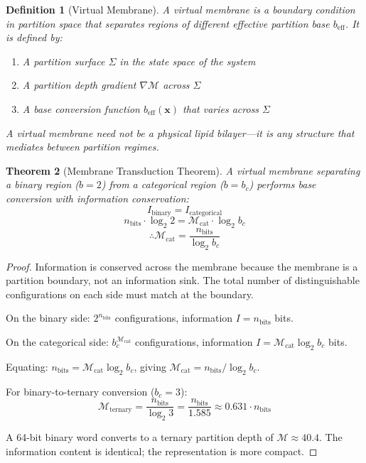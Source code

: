\documentclass[twocolumn,10pt]{article}
\newtheorem{theorem}{Theorem}[section]
\newtheorem{definition}[theorem]{Definition}
\theoremstyle{remark}
\newcommand{\Depth}{\mathcal{M}}
\begin{document}
\begin{definition}[Virtual Membrane]
\label{def:virtual_membrane}
A \emph{virtual membrane} is a boundary condition in partition space that separates regions of different effective partition base $b_{\text{eff}}$. It is defined by:
\begin{enumerate}
    \item A partition surface $\Sigma$ in the state space of the system
    \item A partition depth gradient $\nabla\Depth$ across $\Sigma$
    \item A base conversion function $b_{\text{eff}}(\mathbf{x})$ that varies across $\Sigma$
\end{enumerate}
A virtual membrane need not be a physical lipid bilayer---it is any structure that mediates between partition regimes.
\end{definition}

\begin{theorem}[Membrane Transduction Theorem]
\label{thm:transduction}
A virtual membrane separating a binary region ($b = 2$) from a categorical region ($b = b_c$) performs base conversion with information conservation:
\begin{equation}
    I_{\text{binary}} = I_{\text{categorical}}
\end{equation}
\begin{equation}
    n_{\text{bits}} \cdot \log_2 2 = \Depth_{\text{cat}} \cdot \log_2 b_c
\end{equation}
\begin{equation}
    \therefore \Depth_{\text{cat}} = \frac{n_{\text{bits}}}{\log_2 b_c}
\end{equation}
\end{theorem}

\begin{proof}
Information is conserved across the membrane because the membrane is a partition boundary, not an information sink. The total number of distinguishable configurations on each side must match at the boundary.

On the binary side: $2^{n_{\text{bits}}}$ configurations, information $I = n_{\text{bits}}$ bits.

On the categorical side: $b_c^{\Depth_{\text{cat}}}$ configurations, information $I = \Depth_{\text{cat}} \log_2 b_c$ bits.

Equating: $n_{\text{bits}} = \Depth_{\text{cat}} \log_2 b_c$, giving $\Depth_{\text{cat}} = n_{\text{bits}} / \log_2 b_c$.

For binary-to-ternary conversion ($b_c = 3$):
\begin{equation}
    \Depth_{\text{ternary}} = \frac{n_{\text{bits}}}{\log_2 3} = \frac{n_{\text{bits}}}{1.585} \approx 0.631 \cdot n_{\text{bits}}
\end{equation}

A 64-bit binary word converts to a ternary partition depth of $\Depth \approx 40.4$. The information content is identical; the representation is more compact.
\end{proof}
\end{document}

